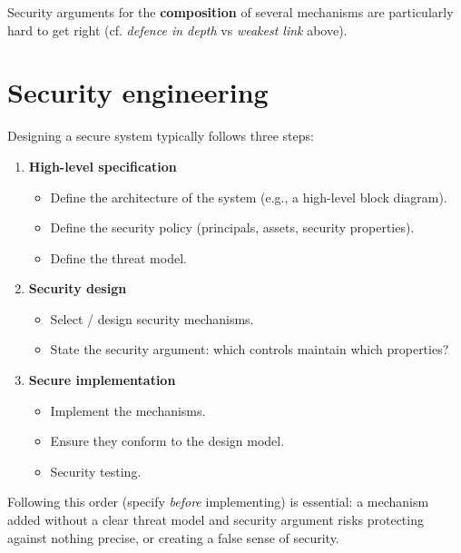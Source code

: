 \begin{remark}
Security arguments for the \textbf{composition} of several mechanisms are particularly hard to get right (cf. \emph{defence in depth} vs \emph{weakest link} above).
\end{remark}

\section{Security engineering}

Designing a secure system typically follows three steps:

\begin{enumerate}
    \item \textbf{High-level specification}
    \begin{itemize}
        \item Define the architecture of the system (e.g., a high-level block diagram).
        \item Define the security policy (principals, assets, security properties).
        \item Define the threat model.
    \end{itemize}
    \item \textbf{Security design}
    \begin{itemize}
        \item Select / design security mechanisms.
        \item State the security argument: which controls maintain which properties?
    \end{itemize}
    \item \textbf{Secure implementation}
    \begin{itemize}
        \item Implement the mechanisms.
        \item Ensure they conform to the design model.
        \item Security testing.
    \end{itemize}
\end{enumerate}

\begin{remark}
Following this order (specify \emph{before} implementing) is essential: a mechanism added without a clear threat model and security argument risks protecting against nothing precise, or creating a false sense of security.
\end{remark}

